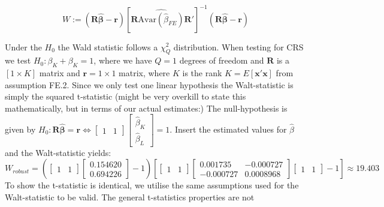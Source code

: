 \begin{equation*}
    W:=(\mathbf{R}\widehat{\boldsymbol{\beta}}-\mathbf{r})[\mathbf{R}\widehat{\text{Avar}(\widehat{\beta}_{FE})}\mathbf{R}']^{-1}(\mathbf{R} \boldsymbol{\widehat{\beta}}-\mathbf{r})
\end{equation*}

Under the $H_0$ the Wald statistic follows a $\chi^2_Q$ distribution. When testing for CRS we test $H_0:\beta_K+\beta_K=1$, where we have $Q=1$ degrees of freedom and  $\mathbf{R}$ is a $[1 \times K]$ matrix and $\textbf{r}=1 \times 1$ matrix, where $K$ is the rank $K=E[\textbf{x}'\textbf{x}]$  from assumption FE.2. Since we only test one linear hypothesis the Walt-statistic is simply the squared t-statistic (might be very overkill to state this mathematically, but in terms of our actual estimates:)
The null-hypothesis is given by  $H_0: \mathbf{R}\boldsymbol{\hat{\beta}}=\mathbf{r}\Leftrightarrow \begin{bmatrix}1&1 \end{bmatrix} \begin{bmatrix}\hat{\beta}_K\\ \hat{\beta}_L \end{bmatrix}=1$. Insert the estimated values for $\hat{\beta}$ and the Walt-statistic yields:
\begin{equation*}
    W_{robust}= (\begin{bmatrix}1&1 \end{bmatrix} 
    \begin{bmatrix} 0.154620 \\ 0.694226 \end{bmatrix}-1)[\begin{bmatrix}1&1 \end{bmatrix}
    \begin{bmatrix}
        0.001735 & -0.000727 \\ 
        -0.000727 & 0.0008968
    \end{bmatrix} \begin{bmatrix}1&1 \end{bmatrix}-1]\approx19.403
\end{equation*}
To show the t-statistic is identical, we utilise the same assumptions used for the Walt-statistic to be valid. The general t-statistics properties are not 


